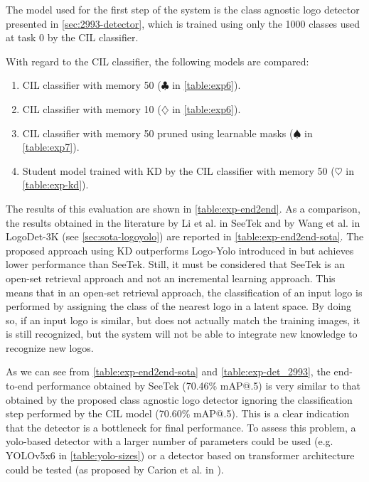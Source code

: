The model used for the first step of the system is the class agnostic logo detector presented in \autoref{sec:2993-detector}, which is trained using only the 1000 classes used at task 0 by the CIL classifier.

With regard to the CIL classifier, the following models are compared:
\begin{enumerate}
    \item CIL classifier with memory 50 ($\clubsuit$ in \autoref{table:exp6}).
    \item CIL classifier with memory 10 ($\diamondsuit$ in \autoref{table:exp6}).
    \item CIL classifier with memory 50 pruned using learnable masks ($\spadesuit$ in \autoref{table:exp7}).
    \item Student model trained with KD by the CIL classifier with memory 50 ($\heartsuit$ in \autoref{table:exp-kd}).
\end{enumerate}

The results of this evaluation are shown in \autoref{table:exp-end2end}. As a comparison, the results obtained in the literature by Li et al. in SeeTek \cite{li2022seetek} and by Wang et al. in LogoDet-3K \cite{wang2022logodet} (see \autoref{sec:sota-logoyolo}) are reported in \autoref{table:exp-end2end-sota}. The proposed approach using KD outperforms Logo-Yolo introduced in \cite{wang2022logodet} but achieves lower performance than SeeTek.
Still, it must be considered that SeeTek is an open-set retrieval approach and not an incremental learning approach.
This means that in an open-set retrieval approach, the classification of an input logo is performed by assigning the class of the nearest logo in a latent space. By doing so, if an input logo is similar, but does not actually match the training images, it is still recognized, but the system will not be able to integrate new knowledge to recognize new logos.

As we can see from \autoref{table:exp-end2end-sota} and \autoref{table:exp-det_2993}, the end-to-end performance obtained by SeeTek (70.46\% mAP@.5) is very similar to that obtained by the proposed class agnostic logo detector ignoring the classification step performed by the CIL model (70.60\% mAP@.5). This is a clear indication that the detector is a bottleneck for final performance. To assess this problem, a yolo-based detector with a larger number of parameters could be used (e.g. YOLOv5x6 in \autoref{table:yolo-sizes}) or a detector based on transformer architecture could be tested (as proposed by Carion et al. in \cite{carion2020end}).

